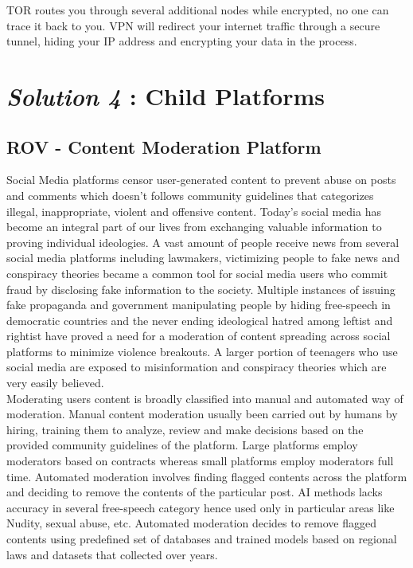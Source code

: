 \documentclass[letterpaper,11pt]{article}
\begin{document}
TOR routes you through several additional nodes while encrypted, no one can trace it back to you. VPN will redirect your internet traffic through a secure tunnel, hiding your IP address and encrypting your data in the process.\\

\section{\textbf{\textit{Solution 4} : Child Platforms}}

\subsection{\textbf{ROV - Content Moderation Platform}}

Social Media platforms censor user-generated content to prevent abuse on posts and comments which doesn't follows community guidelines that categorizes illegal, inappropriate, violent and offensive content.  Today's social media has become an integral part of our lives from exchanging valuable information to proving individual ideologies. A vast amount of people receive news from several social media platforms including lawmakers, victimizing people to fake news and conspiracy theories became a common tool for social media users who commit fraud by disclosing fake information to the society. Multiple instances of issuing fake propaganda and government manipulating people by hiding free-speech in democratic countries and the never ending ideological hatred among leftist and rightist have proved a need for a moderation of content spreading across social platforms to minimize violence breakouts. A larger portion of teenagers who use social media are exposed to misinformation and conspiracy theories which are very easily believed.\\

Moderating users content is broadly classified into manual and automated way of moderation. Manual content moderation usually been carried out by humans by hiring, training them to analyze, review and make decisions based on the provided community guidelines of the platform. Large platforms employ moderators based on contracts whereas small platforms employ moderators full time. Automated moderation involves finding flagged contents across the platform and deciding to remove the contents of the  particular post. AI methods lacks accuracy in several free-speech category hence used only in particular areas like Nudity, sexual abuse, etc. Automated moderation decides to remove flagged contents using predefined set of databases and trained models based on regional laws and datasets that collected over years.\\
\end{document}
